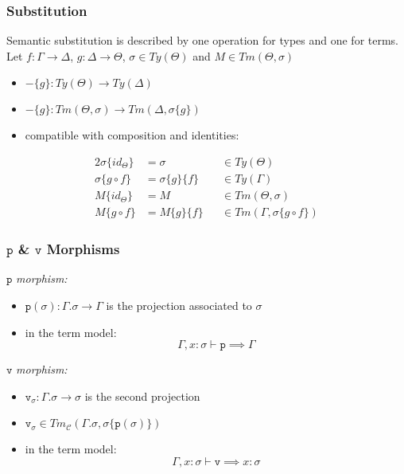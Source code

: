 \documentclass[aspectratio=169]{beamer}
\newcommand{\cate}{\mathcal{C}}
\newcommand{\terms}{Tm_{\cate}}
\newcommand{\pp}{\texttt{p}}
\newcommand{\vv}{\texttt{v}}
\newcommand{\extension}{\Gamma.\sigma}
\begin{document}
     \begin{frame}
        \frametitle{Substitution}
        \vspace{10pt}
        Semantic substitution is described by one operation for types and one for terms.\\
        \vspace{8pt}
        Let $f: \Gamma\to\Delta$, $g: \Delta\to\Theta$, $\sigma\in Ty(\Theta)$ and $M\in Tm(\Theta,\sigma)$
        \begin{itemize}
            \item $-\{g\}: Ty(\Theta)\to Ty(\Delta)$
            \item $-\{g\}:Tm(\Theta,\sigma)\to Tm(\Delta,\sigma\{g\})$
            \item compatible with composition and identities:
        \end{itemize}
        \begin{alignat*}{2}
            \sigma\{id_\Theta\} &= \sigma &&\in Ty(\Theta)\\
            \sigma\{g\circ f\} &= \sigma\{g\}\{f\} &&\in Ty(\Gamma)\\
            M\{id_\Theta\} &= M &&\in Tm(\Theta,\sigma)\\
            M\{g\circ f\} &= M\{g\}\{f\} &&\in Tm(\Gamma,\sigma\{g\circ f\})
        \end{alignat*}
    \end{frame}

    \begin{frame}
        \frametitle{$\pp$ \& $\vv$ Morphisms}
        $\pp$ \emph{morphism:}
        \begin{itemize}
            \item $\pp(\sigma):\extension\to\Gamma$ is the projection associated to $\sigma$
            \item in the term model:
            $$\Gamma,x:\sigma\vdash\pp\implies\Gamma$$
        \end{itemize}
        \vspace{8pt}
        $\vv$ \emph{morphism:}
        \begin{itemize}
            \item $\vv_\sigma:\extension\to\sigma$ is the second projection
            \item $\vv_\sigma \in \terms(\extension,\sigma\{\pp(\sigma)\})$
            \item in the term model:
            $$\Gamma,x:\sigma\vdash \vv \implies x:\sigma$$
        \end{itemize}
    \end{frame}
\end{document}
